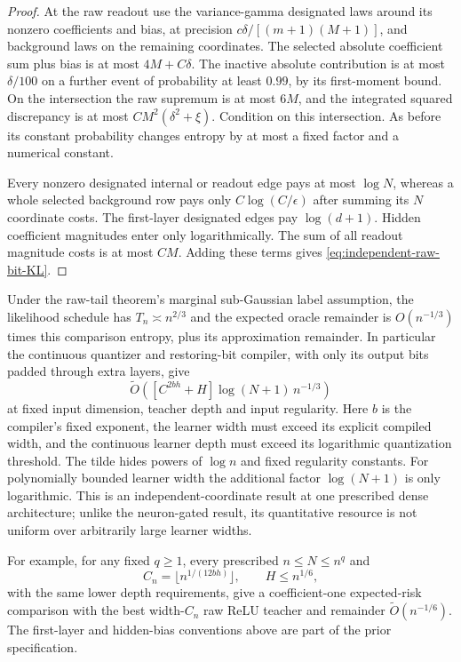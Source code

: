 \begin{proof}
At the raw readout use the variance-gamma designated laws around
its nonzero coefficients and bias, at precision
$c\delta/[(m+1)(M+1)]$, and background laws on the remaining
coordinates. The selected absolute coefficient sum plus bias
is at most $4M+C\delta$. The inactive absolute contribution is
at most $\delta/100$ on a further event of probability at least
$0.99$, by its first-moment bound. On the intersection the raw
supremum is at most $6M$, and the integrated squared discrepancy
is at most $CM^2(\delta^2+\xi)$.
Condition on this intersection. As before its constant probability
changes entropy by at most a fixed factor and a numerical constant.

Every nonzero designated internal or readout edge pays at most
$\log N$, whereas a whole selected background row pays only
$C\log(C/\epsilon)$ after summing its $N$ coordinate costs.
The first-layer designated edges pay $\log(d+1)$.
Hidden coefficient magnitudes enter only logarithmically.
The sum of all readout magnitude costs is at most $CM$.
Adding these terms gives \eqref{eq:independent-raw-bit-KL}.
\end{proof}

Under the raw-tail theorem's marginal sub-Gaussian label assumption,
the likelihood schedule has $T_n\asymp n^{2/3}$ and the expected
oracle remainder is $O(n^{-1/3})$ times this comparison entropy,
plus its approximation remainder. In particular the continuous
quantizer and restoring-bit compiler, with only its output bits
padded through extra layers, give
\[
 \widetilde O\!\left(
    [C^{2bh}+H]\log(N+1)\,n^{-1/3}\right)
\]
at fixed input dimension, teacher depth and input regularity.
Here $b$ is the compiler's fixed exponent, the learner width must
exceed its explicit compiled width, and the continuous learner depth
must exceed its logarithmic quantization threshold.
The tilde hides powers of $\log n$ and fixed regularity constants.
For polynomially bounded learner width the additional factor
$\log(N+1)$ is only logarithmic. This is an independent-coordinate
result at one prescribed dense architecture; unlike the
neuron-gated result, its quantitative resource is not uniform
over arbitrarily large learner widths.

For example, for any fixed $q\ge1$, every prescribed $n\le N\le n^q$
and
\[
 C_n=\lfloor n^{1/(12bh)}\rfloor,\qquad H\le n^{1/6},
\]
with the same lower depth requirements, give a coefficient-one
expected-risk comparison with the best width-$C_n$ raw ReLU teacher and
remainder $\widetilde O(n^{-1/6})$.  The first-layer and hidden-bias
conventions above are part of the prior specification.

